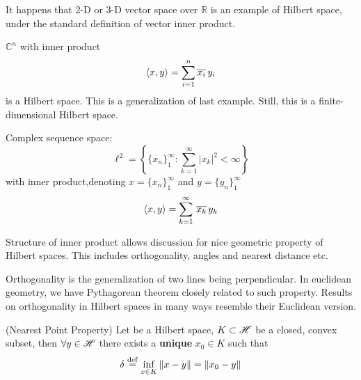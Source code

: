 \documentclass{article}
\begin{document}
\begin{unexaminable}
\begin{example}\rm\nextline
	It happens that 2-D or 3-D vector space over $\mathbb R$ is an example of Hilbert space, under the standard definition of vector inner product.
\end{example}

\begin{example}\rm\nextline
	${\mathbb C}^n$ with inner product
	$$
		\left<{x},{y}\right>=\sum_{i=1}^n {\overline{x_i}}\,y_i
	$$
	is a Hilbert space. This is a generalization of last example. Still, this is a finite-dimensional Hilbert space.
\end{example}
\end{unexaminable}


\begin{example}\rm\nextline
	Complex sequence space:
	$$\ell^2=
		\left\{\{x_n\}_1^\infty:\sum_{k=1}^\infty |x_k|^2<\infty \right\}$$
	with  inner product,denoting $x=\{x_n\}_1^\infty$ and $y=\{y_n\}_1^\infty$
	$$
		\left<{x},{y}\right>=\sum_{k=1}^\infty \,{\overline{x_k}\, y_k}
	$$
\end{example}

\begin{unexaminable}
Structure of inner product allows discussion for nice geometric property of Hilbert spaces. This includes orthogonality, angles and nearest distance etc.
\end{unexaminable}
\begin{unexaminable}
Orthogonality is the generalization of two lines being perpendicular. In euclidean geometry, we have Pythagorean theorem closely related to such property. Results on orthogonality in Hilbert spaces in many ways resemble their Euclidean version.
\end{unexaminable}

\begin{proposition}
(Nearest Point Property)
	Let \hbs be a Hilbert space, $K\subset \mathscr{H}$ be a closed, convex subset, then $\forall y \in \mathscr{H}$ there exists a {\bf{unique}} $x_0\in K$ such that
	$$
		\delta \overset{\rm{def}}{=} \inf_{x\in K} \left\|{x-y}\right\| = \left\|{x_0-y}\right\|
	$$
\end{proposition}
\end{document}
